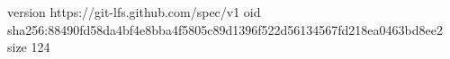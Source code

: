 version https://git-lfs.github.com/spec/v1
oid sha256:88490fd58da4bf4e8bba4f5805c89d1396f522d56134567fd218ea0463bd8ee2
size 124
